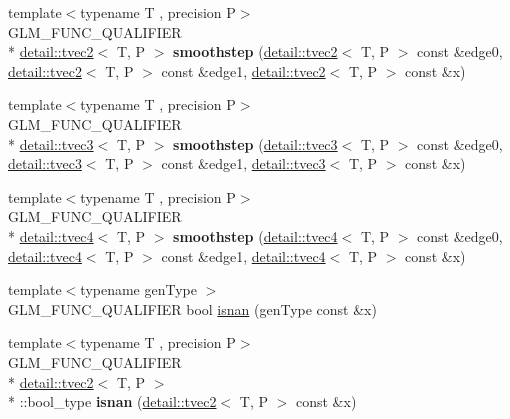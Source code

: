 \begin{DoxyCompactItemize}
\item 
\hypertarget{namespaceglm_a5eaf205dc0b9126303cbb1c7593b4665}{{\footnotesize template$<$typename T , precision P$>$ }\\G\-L\-M\-\_\-\-F\-U\-N\-C\-\_\-\-Q\-U\-A\-L\-I\-F\-I\-E\-R \\*
\hyperlink{structglm_1_1detail_1_1tvec2}{detail\-::tvec2}$<$ T, P $>$ {\bfseries smoothstep} (\hyperlink{structglm_1_1detail_1_1tvec2}{detail\-::tvec2}$<$ T, P $>$ const \&edge0, \hyperlink{structglm_1_1detail_1_1tvec2}{detail\-::tvec2}$<$ T, P $>$ const \&edge1, \hyperlink{structglm_1_1detail_1_1tvec2}{detail\-::tvec2}$<$ T, P $>$ const \&x)}\label{namespaceglm_a5eaf205dc0b9126303cbb1c7593b4665}

\item 
\hypertarget{namespaceglm_aa88da2d789f89fe917cbcd5855706707}{{\footnotesize template$<$typename T , precision P$>$ }\\G\-L\-M\-\_\-\-F\-U\-N\-C\-\_\-\-Q\-U\-A\-L\-I\-F\-I\-E\-R \\*
\hyperlink{structglm_1_1detail_1_1tvec3}{detail\-::tvec3}$<$ T, P $>$ {\bfseries smoothstep} (\hyperlink{structglm_1_1detail_1_1tvec3}{detail\-::tvec3}$<$ T, P $>$ const \&edge0, \hyperlink{structglm_1_1detail_1_1tvec3}{detail\-::tvec3}$<$ T, P $>$ const \&edge1, \hyperlink{structglm_1_1detail_1_1tvec3}{detail\-::tvec3}$<$ T, P $>$ const \&x)}\label{namespaceglm_aa88da2d789f89fe917cbcd5855706707}

\item 
\hypertarget{namespaceglm_a0eb15c7d255088706c5b00f7214512e0}{{\footnotesize template$<$typename T , precision P$>$ }\\G\-L\-M\-\_\-\-F\-U\-N\-C\-\_\-\-Q\-U\-A\-L\-I\-F\-I\-E\-R \\*
\hyperlink{structglm_1_1detail_1_1tvec4}{detail\-::tvec4}$<$ T, P $>$ {\bfseries smoothstep} (\hyperlink{structglm_1_1detail_1_1tvec4}{detail\-::tvec4}$<$ T, P $>$ const \&edge0, \hyperlink{structglm_1_1detail_1_1tvec4}{detail\-::tvec4}$<$ T, P $>$ const \&edge1, \hyperlink{structglm_1_1detail_1_1tvec4}{detail\-::tvec4}$<$ T, P $>$ const \&x)}\label{namespaceglm_a0eb15c7d255088706c5b00f7214512e0}

\item 
{\footnotesize template$<$typename gen\-Type $>$ }\\G\-L\-M\-\_\-\-F\-U\-N\-C\-\_\-\-Q\-U\-A\-L\-I\-F\-I\-E\-R bool \hyperlink{group__core__func__common_ga8a9dec5200888766fbcb51b6a5898728}{isnan} (gen\-Type const \&x)
\item 
\hypertarget{namespaceglm_a1b217bcbf88c251bc92fdcf38e5beae6}{{\footnotesize template$<$typename T , precision P$>$ }\\G\-L\-M\-\_\-\-F\-U\-N\-C\-\_\-\-Q\-U\-A\-L\-I\-F\-I\-E\-R \\*
\hyperlink{structglm_1_1detail_1_1tvec2}{detail\-::tvec2}$<$ T, P $>$\\*
\-::bool\-\_\-type {\bfseries isnan} (\hyperlink{structglm_1_1detail_1_1tvec2}{detail\-::tvec2}$<$ T, P $>$ const \&x)}\label{namespaceglm_a1b217bcbf88c251bc92fdcf38e5beae6}


\end{DoxyCompactItemize}
